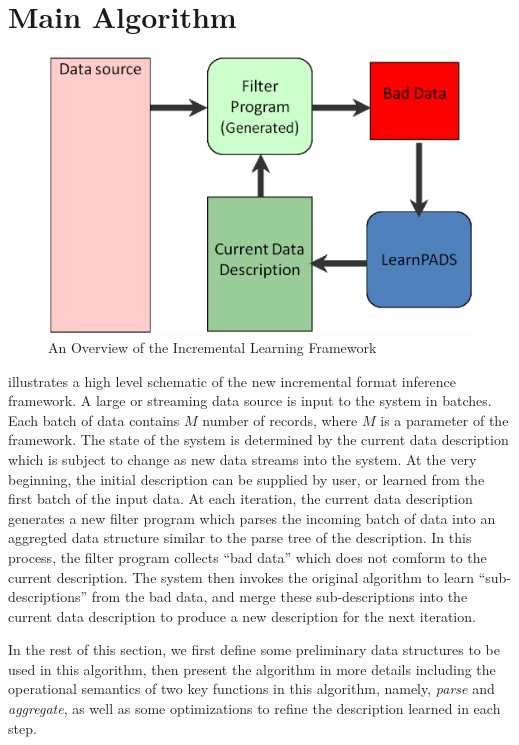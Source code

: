 \section{Main Algorithm}\label{sec:algo}

\begin{figure}[th]
\centering
\includegraphics[width=0.9\columnwidth]{overview}
\caption{An Overview of the Incremental Learning Framework}
\label{fig:overview}
\end{figure}

 illustrates a high level schematic of the new incremental
format inference framework. A large or streaming data source is input
to the system in batches. Each batch of data contains $M$ number of
records, where $M$ is a parameter of the framework.
The state of the system is determined
by the current data description which is subject to change as new data
streams into the system. At the very beginning, the initial description
can be supplied by user, or learned from the first batch of the input
data. At each iteration, the current data description
generates a new filter program which parses the incoming batch of data
into an aggregted data structure similar to the parse tree of the description.
In this process, the filter program collects ``bad data'' which does not
comform to the current description. The system then invokes the original
\learnpads{} algorithm to learn ``sub-descriptions'' from the bad data, and
merge these sub-descriptions into the current data description to produce
a new description for the next iteration. 

In the rest of this section, we first define some preliminary data structures 
to be used in this algorithm, then present
the algorithm in more details including the operational semantics
of two key functions in this algorithm, namely, 
{\em parse} and {\em aggregate}, as well as some optimizations to refine
the description learned in each step.


